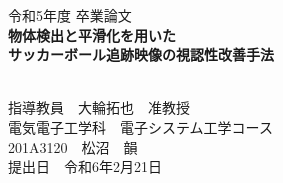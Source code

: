 \documentclass[11pt,a4j]{jreport}
\begin{document}
\thispagestyle{empty}
\begin{center}

    \vspace{20mm}
    {\Large\noindent 令和5年度 卒業論文}\\
    \vspace{40mm}
    {\huge\noindent\textbf{物体検出と平滑化を用いた\\サッカーボール追跡映像の視認性改善手法}}\\
    \medskip
    \vspace{\baselineskip}

    \vspace{\baselineskip}
    \vspace{\baselineskip}
    \vspace{\baselineskip}
    \vspace{\baselineskip}
    \vspace{\baselineskip}
    \vspace{\baselineskip}\vspace{\baselineskip}\vspace{\baselineskip}\vspace{\baselineskip}
    {\Large\noindent
        \\
        \vspace{\baselineskip}
        指導教員　大輪拓也　准教授    \\
        \vspace{\baselineskip}
        \vspace{\baselineskip}\vspace{\baselineskip}
        電気電子工学科　電子システム工学コース \\
        \vspace{\baselineskip}
        201A3120　松沼　韻\\
        \vspace{\baselineskip}\vspace{\baselineskip}
        提出日　令和6年2月21日\\
    }
    \vspace{40mm}

\end{center}

\thispagestyle{empty}
\clearpage

\renewcommand{\abstractname}{概要}
\end{document}
